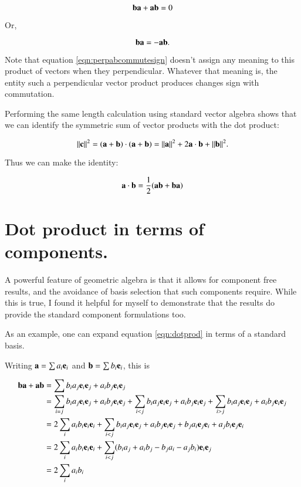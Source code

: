 \documentclass{article}      %
\begin{document}
\[
\mathbf{b}\mathbf{a} + \mathbf{a}\mathbf{b} = 0
\]

Or, 

\begin{equation}\label{eqn:perpabcommutesign}
\mathbf{b}\mathbf{a} = -\mathbf{a}\mathbf{b}.
\end{equation}

Note that equation \ref{eqn:perpabcommutesign} doesn't assign any meaning to this product of vectors when they perpendicular.
Whatever that meaning is, the entity such a perpendicular vector product produces changes sign
with commutation.

Performing the same length calculation using standard vector algebra shows that we can identify the symmetric 
sum of vector products with the dot product:

\begin{equation}\label{eqn:standarddot}
\lVert{\mathbf{c}}\rVert^2 = (\mathbf{a} + \mathbf{b}) \cdot (\mathbf{a} + \mathbf{b}) = \lVert{\mathbf{a}}\rVert^2 + 2 \mathbf{a} \cdot \mathbf{b} + \lVert{\mathbf{b}}\rVert^2.
\end{equation}

Thus we can make the identity:

\begin{equation}\label{eqn:dotprod}
\mathbf{a} \cdot \mathbf{b} = \frac{1}{2}(\mathbf{a} \mathbf{b} + \mathbf{b} \mathbf{a})
\end{equation}

\section{ Dot product in terms of components. }

A powerful feature of geometric algebra is that it allows for component free results, and the avoidance of basis selection
that such components require.  While this is true, I found it helpful for myself to demonstrate that the results
do provide the standard component formulations too.

As an example, one can expand equation \ref{eqn:dotprod} in terms of a standard basis.

Writing $\mathbf{a} = \sum{a_i \mathbf{e}_i}$ and $\mathbf{b} = \sum{b_i \mathbf{e}_i}$, this is

\begin{align*}
\mathbf{b}\mathbf{a} + \mathbf{a}\mathbf{b}
        &= \sum{b_i a_j \mathbf{e}_i \mathbf{e}_j + a_i b_j \mathbf{e}_i \mathbf{e}_j} \\
        &= 
          \sum_{i = j} {b_i a_j \mathbf{e}_i \mathbf{e}_j + a_i b_j \mathbf{e}_i \mathbf{e}_j} 
        + \sum_{i < j} {b_i a_j \mathbf{e}_i \mathbf{e}_j + a_i b_j \mathbf{e}_i \mathbf{e}_j} 
        + \sum_{i > j} {b_i a_j \mathbf{e}_i \mathbf{e}_j + a_i b_j \mathbf{e}_i \mathbf{e}_j} \\
        &= 
        2 \sum_{i} {a_i b_i \mathbf{e}_i \mathbf{e}_i} 
        + \sum_{i < j} {b_i a_j \mathbf{e}_i \mathbf{e}_j + a_i b_j \mathbf{e}_i \mathbf{e}_j
        + b_j a_i \mathbf{e}_j \mathbf{e}_i + a_j b_i \mathbf{e}_j \mathbf{e}_i} \\
        &=
        2 \sum_{i} {a_i b_i \mathbf{e}_i \mathbf{e}_i} 
        + \sum_{i < j} (b_i a_j + a_i b_j - b_j a_i - a_j b_i ) \mathbf{e}_i \mathbf{e}_j \\
        &=
        2 \sum_{i} {a_i b_i} 
\end{align*}
\end{document}
